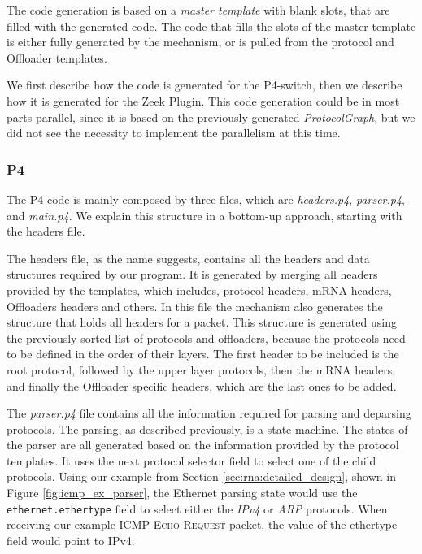 The code generation is based on a \textit{master template} with blank slots, that are filled with the generated code. The code that fills the slots of the master template is either fully generated by the mechanism, or is pulled from the protocol and Offloader templates.

We first describe how the code is generated for the P4-switch, then we describe how it is generated for the Zeek Plugin. This code generation could be in most parts parallel, since it is based on the previously generated \textit{ProtocolGraph}, but we did not see the necessity to implement the parallelism at this time.

\subsubsection*{P4}

The P4 code is mainly composed by three files, which are \textit{headers.p4}, \textit{parser.p4}, and \textit{main.p4}. We explain this structure in a bottom-up approach, starting with the headers file.

The headers file, as the name suggests, contains all the headers and data structures required by our program. It is generated by merging all headers provided by the templates, which includes, protocol headers, mRNA headers, Offloaders headers and others. In this file the mechanism also generates the structure that holds all headers for a packet. This structure is generated using the previously sorted list of protocols and offloaders, because the protocols need to be defined in the order of their layers. The first header to be included is the root protocol, followed by the upper layer protocols, then the mRNA headers, and finally the Offloader specific headers, which are the last ones to be added.

The \textit{parser.p4} file contains all the information required for parsing and deparsing protocols. The parsing, as described previously, is a state machine. The states of the parser are all generated based on the information provided by the protocol templates. It uses the next protocol selector field to select one of the child protocols. Using our example from Section \ref{sec:rna:detailed_design}, shown in Figure \ref{fig:icmp_ex_parser}, the Ethernet parsing state would use the \texttt{ethernet.ethertype} field to select either the \textit{IPv4} or \textit{ARP} protocols. When receiving our example \textsc{ICMP Echo Request} packet, the value of the ethertype field would point to IPv4.

